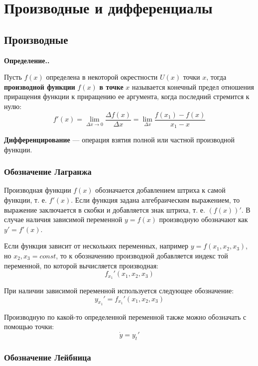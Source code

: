 \documentclass[a4paper,12pt,oneside]{extbook}
\newcommand{\newpar}{$ $\par\nobreak\ignorespaces}
\newenvironment{definition}[1][]{\noindent\textbf{Определение.\if\relax\detokenize{#1}\relax\else\;#1.\fi}\newpar}{\bigskip}
\theoremstyle{numbered}
\theoremstyle{unnumbered}
\theoremstyle{named}
\theoremstyle{unnumbered}
\theoremstyle{named}
\theoremstyle{named}
\theoremstyle{named}
\begin{document}
\chapter{Производные и дифференциалы}%
\label{cha:Производные и дифференциалы}

\section{Производные}%
\label{sec:Производные}

\begin{definition}
    Пусть \(f(x)\) определена в некоторой окрестности \(U(x)\) точки \(x\), тогда \textbf{производной функции} \(f(x)\) \textbf{в точке} \(x\) называется конечный предел отношения приращения функции к приращению ее аргумента, когда последний стремится к нулю:
    \[
        f'(x) =
        \lim_{\Delta{x} \to 0}{\frac{\Delta{f(x)}}{\Delta{x}}} =
        \lim_{\Delta{x}}{\frac{f(x_1) - f(x)}{x_1 - x}}
    \]

    \textbf{Дифференцирование} — операция взятия полной или частной производной функции.
\end{definition}

\subsection{Обозначение Лагранжа}%
\label{sub:Обозначение Лагранжа}

Производная функции \(f(x)\) обозначается добавлением штриха к самой функции, т. е. \(f'(x)\).
Если функция задана алгебраическим выражением, то выражение заключается в скобки и добавляется знак штриха, т. е. \((f(x))'\). В случае наличия зависимой переменной \(y = f(x)\) производную обозначают как \(y' = f'(x)\).

Если функция зависит от нескольких переменных, например \(y = f(x_1, x_2, x_3)\), но \(x_2,x_3 = const\), то к обозначению производной добавляется индекс той переменной, по которой вычисляется производная:
\[
    f_{x_1}'(x_1, x_2, x_3)
\]

При наличии зависимой переменной используется следующее обозначение:
\[
    y_{x_1}' = f_{x_1}'(x_1, x_2, x_3)
\]

Производную по какой-то определенной переменной также можно обозначать с помощью точки:
\[
    \dot{y} = y_{t}'
\]

\subsection{Обозначение Лейбница}%
\label{sub:Обозначение Лейбница}
\end{document}

